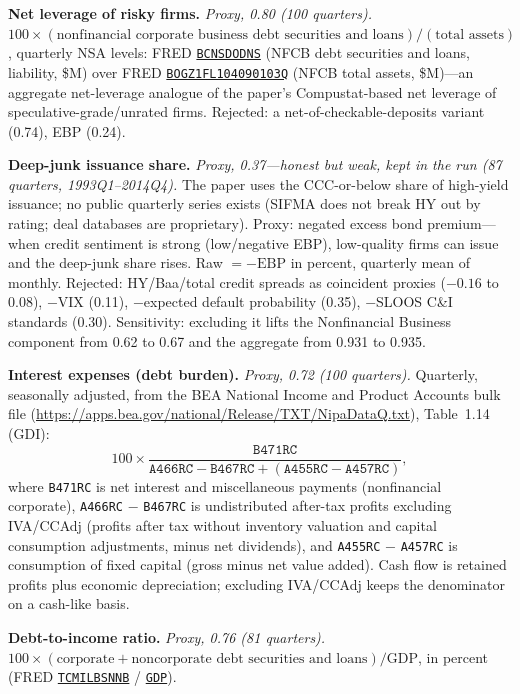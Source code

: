 \documentclass[11pt]{article}
\newcommand{\fred}[1]{\href{https://fred.stlouisfed.org/series/#1}{\texttt{#1}}}
\begin{document}
\textbf{Net leverage of risky firms.} \textit{Proxy, 0.80 (100
quarters).} $100 \times (\text{nonfinancial corporate business debt
securities and loans}) / (\text{total assets})$, quarterly NSA levels:
FRED \fred{BCNSDODNS} (NFCB debt securities and loans, liability,
\$M) over FRED \fred{BOGZ1FL104090103Q} (NFCB total assets, \$M)---an
aggregate net-leverage analogue of the paper's Compustat-based net
leverage of speculative-grade/unrated firms.  Rejected: a
net-of-checkable-deposits variant (0.74), EBP (0.24).

\textbf{Deep-junk issuance share.} \textit{Proxy, 0.37---honest but
weak, kept in the run (87 quarters, 1993Q1--2014Q4).} The paper uses the
CCC-or-below share of high-yield issuance; no public quarterly series
exists (SIFMA does not break HY out by rating; deal databases are
proprietary).  Proxy: negated excess bond premium---when credit
sentiment is strong (low/negative EBP), low-quality firms can issue and
the deep-junk share rises.  Raw $= -\text{EBP}$ in percent, quarterly
mean of monthly.  Rejected: HY/Baa/total credit spreads as coincident
proxies ($-0.16$ to $0.08$), $-\text{VIX}$ (0.11), $-$expected default
probability (0.35), $-$SLOOS C\&I standards (0.30).  Sensitivity:
excluding it lifts the Nonfinancial Business component from 0.62 to
0.67 and the aggregate from 0.931 to 0.935.

\textbf{Interest expenses (debt burden).} \textit{Proxy, 0.72 (100
quarters).} Quarterly, seasonally adjusted, from the BEA National Income
and Product Accounts bulk file
(\url{https://apps.bea.gov/national/Release/TXT/NipaDataQ.txt}),
Table~1.14 (GDI):
\begin{equation}
100 \times \frac{\texttt{B471RC}}
{\texttt{A466RC} - \texttt{B467RC}
+ (\texttt{A455RC} - \texttt{A457RC})},
\end{equation}
where \texttt{B471RC} is net interest and miscellaneous payments
(nonfinancial corporate), \texttt{A466RC} $-$ \texttt{B467RC} is
undistributed after-tax profits excluding IVA/CCAdj (profits after tax
without inventory valuation and capital consumption adjustments, minus
net dividends), and \texttt{A455RC} $-$ \texttt{A457RC} is consumption
of fixed capital (gross minus net value added).  Cash flow is retained
profits plus economic depreciation; excluding IVA/CCAdj keeps the
denominator on a cash-like basis.

\textbf{Debt-to-income ratio.} \textit{Proxy, 0.76 (81 quarters).}
$100 \times (\text{corporate} + \text{noncorporate debt securities and
loans}) / \text{GDP}$, in percent (FRED \fred{TCMILBSNNB} /
\fred{GDP}).
\end{document}
